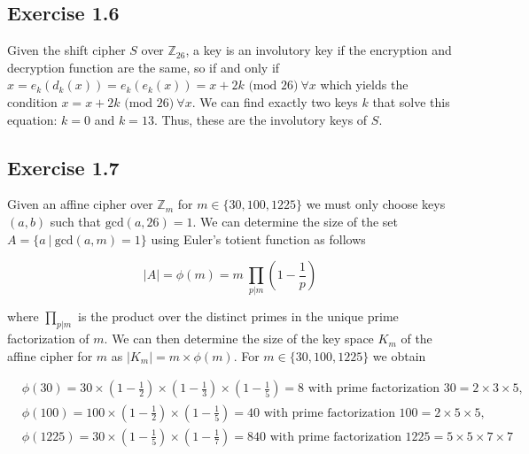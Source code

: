 \documentclass[12pt]{article}
\begin{document}
 


\subsection*{Exercise 1.6}

Given the shift cipher $S$ over $\mathbb{Z}_{26}$, a key is an involutory key if the encryption and decryption function are the same, so if and only if $x = e_k(d_k(x)) = e_k(e_k(x)) = x + 2k \text{ (mod } 26) \ \forall x$ which yields the condition $x = x + 2k \text{ (mod } 26) \ \forall x$. We can find exactly two keys $k$ that solve this equation: $k = 0$ and $k = 13$. Thus, these are the involutory keys of $S$.

\subsection*{Exercise 1.7}

Given an affine cipher over $\mathbb{Z}_m$ for $m \in \{30, 100, 1225\}$ we must only choose keys $(a,b)$ such that $\text{gcd}(a,26) = 1$. We can determine the size of the set $A = \{ a \ | \ \text{gcd}(a,m)=1 \}$ using Euler's totient function as follows

$$
|A| = \phi(m) = m \ \prod_{p|m} \left(1 - \frac{1}{p}\right) 
$$

\noindent where $\prod_{p|m}$ is the product over the distinct primes in the unique prime factorization of $m$. We can then determine the size of the key space $K_m$ of the affine cipher for $m$ as $|K_m| = m \times \phi(m)$. For $m \in \{30, 100, 1225\}$ we obtain

\begin{align*}
& \phi(30) = 30 \times \left(1 - \frac{1}{2}\right) \times \left(1 - \frac{1}{3}\right) \times \left(1 - \frac{1}{5}\right) = 8 \text{ with prime factorization } 30 = 2 \times 3 \times 5,\\
& \phi(100) = 100 \times \left(1 - \frac{1}{2}\right) \times \left(1 - \frac{1}{5}\right) = 40 \text{ with prime factorization } 100 = 2 \times 5 \times 5,\\
& \phi(1225) = 30 \times \left(1 - \frac{1}{5}\right) \times \left(1 - \frac{1}{7}\right) = 840 \text{ with prime factorization } 1225 = 5 \times 5 \times 7 \times 7
\end{align*}
\end{document}
